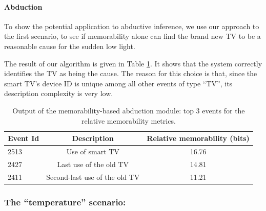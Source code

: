 \documentclass[entropy,article,submit,moreauthors,pdftex]{Definitions/mdpi}
\begin{document}
\paragraph{Abduction}
To show the potential application to abductive inference, we use our approach to the first scenario, to see if memorability alone can find the brand new TV to be a reasonable cause for the sudden low light.

The result of our algorithm is given in Table \ref{tab:abduction_res}. It shows that the system correctly identifies the TV as being the cause. The reason for this choice is that, since the smart TV's device ID is unique among all other events of type ``TV'', its description complexity is very low.


\begin{table}
    \centering
    \begin{tabular}{l|c|c}
        Event Id & Description                   & Relative memorability (bits) \\
        \hline
        2513     & Use of smart TV               & 16.76                        \\
        2427     & Last use of the old TV        & 14.81                        \\
        2411     & Second-last use of the old TV & 11.21
    \end{tabular}
    \caption{Output of the memorability-based abduction module: top 3 events for the relative memorability metrics.}
    \label{tab:abduction_res}
\end{table}

\subsubsection{The ``temperature'' scenario:}
\end{document}
